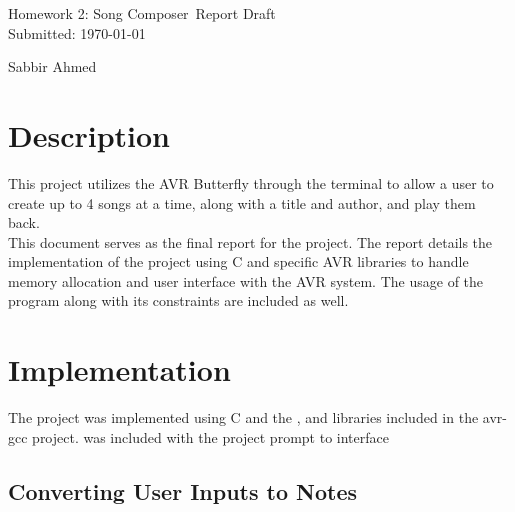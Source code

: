 \documentclass[usletter, 12pt]{article}
\newcommand{\project}{Homework 2: Song Composer}
\newcommand{\Sabbir}{Sabbir Ahmed}
\begin{document}
    \begin{titlepage}

        \vspace*{\fill} %
        \begin{center}

            {\LARGE \project~Report Draft}\\ [1.5cm]

            Submitted: \today
            
            \vspace*{\fill}

            \Sabbir

        \end{center}
        \vspace*{\fill} %

    \end{titlepage}

    \section{Description}

    This project utilizes the AVR Butterfly through the terminal to allow a user to create up to 4 songs at a time, along with a title and author, and play them back. \\

    \noindent This document serves as the final report for the project. The report details the implementation of the project using C and specific AVR libraries to handle memory allocation and user interface with the AVR system. The usage of the program along with its constraints are included as well.

    \section{Implementation}

    The project was implemented using C and the ,  and  libraries included in the avr-gcc project.  was included with the project prompt to interface 

        \subsection{Converting User Inputs to Notes}
\end{document}
